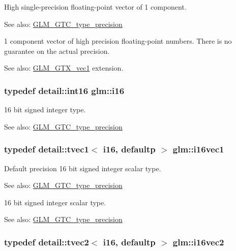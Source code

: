High single-precision floating-point vector of 1 component. \begin{Desc}
\item[See also:]\hyperlink{group__gtc__type__precision}{GLM\_\-GTC\_\-type\_\-precision}\end{Desc}
1 component vector of high precision floating-point numbers. There is no guarantee on the actual precision. \begin{Desc}
\item[See also:]\hyperlink{group__gtx__vec1}{GLM\_\-GTX\_\-vec1} extension. \end{Desc}
\hypertarget{group__gtc__type__precision_g35e5542ca05b29cc256fdafb8503d1fd}{
\subsubsection[i16]{\setlength{\rightskip}{0pt plus 5cm}typedef detail::int16 {\bf glm::i16}}}
\label{group__gtc__type__precision_g35e5542ca05b29cc256fdafb8503d1fd}


16 bit signed integer type. \begin{Desc}
\item[See also:]\hyperlink{group__gtc__type__precision}{GLM\_\-GTC\_\-type\_\-precision} \end{Desc}
\hypertarget{group__gtc__type__precision_ga3a2fe05ca6a7086c5580922ebda4bf3}{
\subsubsection[i16vec1]{\setlength{\rightskip}{0pt plus 5cm}typedef detail::tvec1$<$ i16, defaultp $>$ {\bf glm::i16vec1}}}
\label{group__gtc__type__precision_ga3a2fe05ca6a7086c5580922ebda4bf3}


Default precision 16 bit signed integer scalar type. \begin{Desc}
\item[See also:]\hyperlink{group__gtc__type__precision}{GLM\_\-GTC\_\-type\_\-precision}\end{Desc}
16 bit signed integer scalar type. \begin{Desc}
\item[See also:]\hyperlink{group__gtc__type__precision}{GLM\_\-GTC\_\-type\_\-precision} \end{Desc}
\hypertarget{group__gtc__type__precision_g13f7a88281faec6a72231dce73ce6129}{
\subsubsection[i16vec2]{\setlength{\rightskip}{0pt plus 5cm}typedef detail::tvec2$<$ i16, defaultp $>$ {\bf glm::i16vec2}}}
\label{group__gtc__type__precision_g13f7a88281faec6a72231dce73ce6129}


